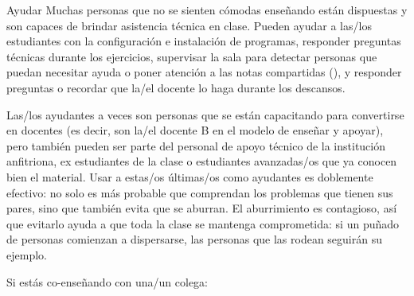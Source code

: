 \begin{aside}{Ayudar}
  Muchas personas que no se sienten cómodas enseñando
  están dispuestas y son capaces de brindar asistencia técnica en clase.
  Pueden ayudar a las/los estudiantes con la configuración e instalación de programas,
  responder preguntas técnicas durante los ejercicios,
  supervisar la sala para detectar personas que puedan necesitar ayuda
  o poner atención a las notas compartidas (),
  y responder preguntas
  o recordar que la/el docente lo haga durante los descansos.

  Las/los ayudantes a veces son personas que se están capacitando para convertirse en docentes
  (es decir, son la/el docente B en el modelo de enseñar y apoyar),
  pero también pueden ser parte del personal de apoyo técnico de la institución anfitriona,
  ex estudiantes de la clase
  o estudiantes avanzadas/os que ya conocen bien el material.
  Usar a estas/os últimas/os como ayudantes es doblemente efectivo: no solo es más probable 
  que comprendan los problemas que tienen sus pares,
  sino que también evita que se aburran.
  El aburrimiento es contagioso, así que evitarlo ayuda a que toda la clase se mantenga comprometida:
  si un puñado de personas comienzan a dispersarse,
  las personas que las rodean seguirán su ejemplo.
\end{aside}

Si estás co-enseñando con una/un colega:

